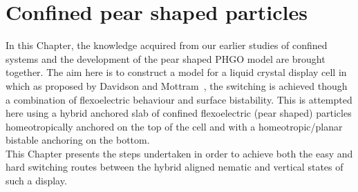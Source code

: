 

\chapter{Confined pear shaped particles}
\label{chap:seven}

\introduction

In this Chapter, the knowledge acquired from our earlier studies of confined systems and the
development of the pear shaped PHGO model are brought together. The aim here is 
to construct a model for a liquid crystal display cell in which 
as proposed by Davidson and Mottram~\cite{DavidsonMottram02}, the switching is achieved though a
combination of flexoelectric behaviour and surface bistability. 
This is attempted here using a hybrid anchored slab of confined flexoelectric (pear shaped) 
particles homeotropically anchored on the top 
of the cell and with a homeotropic/planar bistable anchoring on the bottom.\\
This Chapter presents the steps undertaken in order to achieve both the easy and hard switching
routes between  the hybrid aligned nematic and vertical states of such a display.








\conclusion

